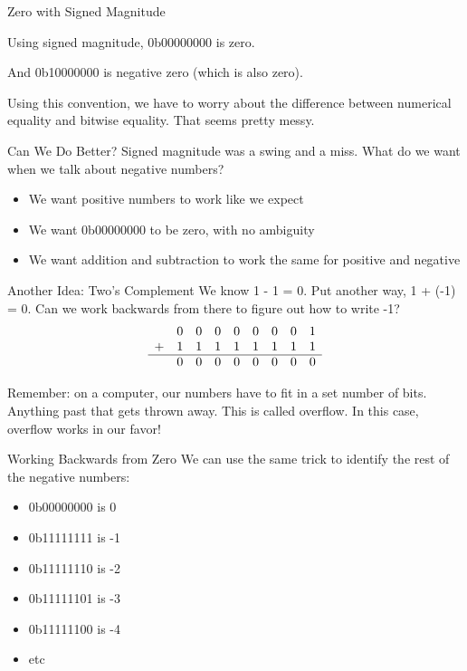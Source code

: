 \begin{frame}{Zero with Signed Magnitude}

    Using signed magnitude, 0b00000000 is zero.

    And 0b10000000 is negative zero (which is also zero).

    Using this convention, we have to worry about the difference between numerical
    equality and bitwise equality. That seems pretty messy.
\end{frame}

\begin{frame}{Can We Do Better?}
    Signed magnitude was a swing and a miss. What do we want when we talk about negative numbers?
    \begin{itemize}
        \item We want positive numbers to work like we expect
        \item We want 0b00000000 to be zero, with no ambiguity
        \item We want addition and subtraction to work the same for positive and negative
    \end{itemize}
\end{frame}

\begin{frame}{Another Idea: Two's Complement}
    We know 1 - 1 = 0. Put another way, 1 + (-1) = 0. Can we work backwards from there to figure out how to write -1?
    \[
        \begin{array}{ccccccccc}
              & 0 & 0 & 0 & 0 & 0 & 0 & 0 & 1 \\
            + & 1 & 1 & 1 & 1 & 1 & 1 & 1 & 1 \\
            \hline
              & 0 & 0 & 0 & 0 & 0 & 0 & 0 & 0 \\
        \end{array}
    \]

    Remember: on a computer, our numbers have to fit in a set number of bits.
    Anything past that gets thrown away. This is called overflow. In this case,
    overflow works in our favor!
\end{frame}

\begin{frame}{Working Backwards from Zero}
    We can use the same trick to identify the rest of the negative numbers:
    \begin{itemize}
        \item 0b00000000 is 0
        \item 0b11111111 is -1
        \item 0b11111110 is -2
        \item 0b11111101 is -3
        \item 0b11111100 is -4
        \item etc
    \end{itemize}

\end{frame}

